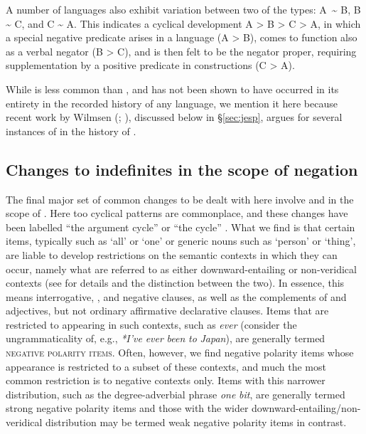 \documentclass[output=paper]{langsci/langscibook}
\begin{document}
A number of languages also exhibit variation between two of the types: A~{\textasciitilde} B, B {\textasciitilde} C, and C {\textasciitilde} A. This indicates a cyclical development A > B > C > A, in which a special negative  predicate arises in a language (A > B), comes to function also as a verbal negator (B > C), and is then felt to be the negator proper, requiring supplementation by a positive  predicate in  constructions (C > A).

While  is less common than , and has not been shown to have occurred in its entirety in the recorded history of any language, we mention it here because recent work by Wilmsen (\citeyear[174–176]{Wilmsen2014}; \citeyear{Wilmsen2016}), discussed below in §\ref{sec:jesp}, argues for several instances of  in the history of .



\subsection{Changes to indefinites in the scope of negation}\label{sec:ind}


The final major set of common changes to be dealt with here involve  and  in the scope of . Here too cyclical patterns are commonplace, and these changes have been labelled “the argument cycle” \citep{Ladusaw1993} or “the  cycle” \citep{Willis2011}. What we find is that certain items, typically  such as ‘all’ or ‘one’ or generic nouns such as ‘person’ or ‘thing’, are liable to develop restrictions on the semantic contexts in which they can occur, namely what are referred to as either downward-entailing or non-veridical contexts (see \citealt{Giannakidou1998} for details and the distinction between the two). In essence, this means interrogative, , and negative clauses, as well as the complements of  and  adjectives, but not ordinary affirmative declarative clauses. Items that are restricted to appearing in such contexts, such as  \textit{ever} (consider the ungrammaticality of, e.g., \textit{*I’ve} \textit{ever} \textit{been} \textit{to} \textit{Japan}), are generally termed \textsc{negative} \textsc{polarity} \textsc{items}. Often, however, we find negative polarity items whose appearance is restricted to a subset of these contexts, and much the most common restriction is to negative contexts only. Items with this narrower distribution, such as the  degree-adverbial phrase \textit{one} \textit{bit}, are generally termed strong negative polarity items and those with the wider downward-entailing/non-veridical distribution may be termed weak negative polarity items in contrast.
\end{document}
